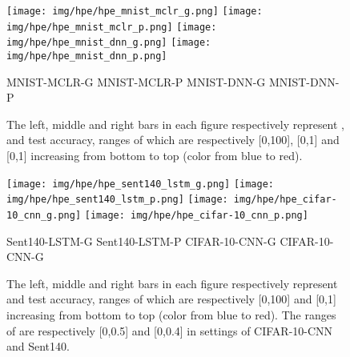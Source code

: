 \documentclass{article}
\begin{document}
\begin{figure*}[ht]\centering
    \texttt{[image: img/hpe/hpe\_mnist\_mclr\_g.png]}
    \texttt{[image: img/hpe/hpe\_mnist\_mclr\_p.png]}
    \texttt{[image: img/hpe/hpe\_mnist\_dnn\_g.png]}
    \texttt{[image: img/hpe/hpe\_mnist\_dnn\_p.png]}
    \begin{center}
        \footnotesize 
        MNIST-MCLR-G \qquad\qquad\qquad MNIST-MCLR-P
        \qquad\qquad\qquad\qquad
        MNIST-DNN-G \qquad\qquad\qquad MNIST-DNN-P
    \end{center}
    \caption{The left, middle and right bars in each figure respectively represent ,  and test accuracy, ranges of which are respectively [0,100], [0,1] and [0,1] increasing from bottom to top (color from blue to red).}
    \label{appdx_fig_hpe_mnist}
\end{figure*}
\begin{figure*}[ht]\centering
    \texttt{[image: img/hpe/hpe\_sent140\_lstm\_g.png]}
    \texttt{[image: img/hpe/hpe\_sent140\_lstm\_p.png]}
    \texttt{[image: img/hpe/hpe\_cifar-10\_cnn\_g.png]}
    \texttt{[image: img/hpe/hpe\_cifar-10\_cnn\_p.png]}
    \begin{center}
        \footnotesize 
        Sent140-LSTM-G \qquad\qquad\qquad Sent140-LSTM-P
        \qquad\qquad\qquad\qquad
        CIFAR-10-CNN-G \qquad\qquad\qquad CIFAR-10-CNN-G
    \end{center}
    \caption{The left, middle and right bars in each figure respectively represent  and test accuracy, ranges of which are respectively [0,100] and [0,1] increasing from bottom to top (color from blue to red). The ranges of  are respectively [0,0.5] and [0,0.4] in settings of CIFAR-10-CNN and Sent140.}
    \label{appdx_fig_hpe_sent140_cifar-10}
\end{figure*}
\end{document}
